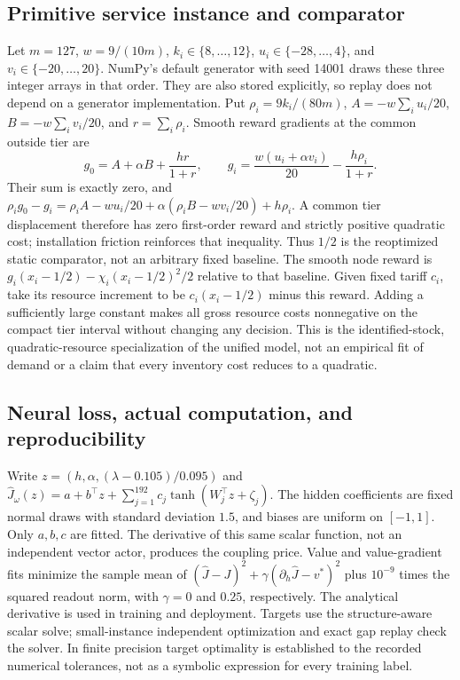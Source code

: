 \documentclass[11pt,letterpaper]{article}
\theoremstyle{definition}
\newcommand{\1}{\mathbf 1}
\begin{document}
\subsection{Primitive service instance and comparator}
Let $m=127$, $w=9/(10m)$, $k_i\in\{8,\ldots,12\}$, $u_i\in\{-28,\ldots,4\}$, and $v_i\in\{-20,\ldots,20\}$. NumPy's default generator with seed 14001 draws these three integer arrays in that order. They are also stored explicitly, so replay does not depend on a generator implementation. Put $\rho_i=9k_i/(80m)$, $A=-w\sum_i u_i/20$, $B=-w\sum_i v_i/20$, and $r=\sum_i\rho_i$. Smooth reward gradients at the common outside tier are
\[
 g_0=A+\alpha B+\frac{hr}{1+r},\qquad
 g_i=\frac{w(u_i+\alpha v_i)}{20}-\frac{h\rho_i}{1+r}.
\]
Their sum is exactly zero, and $\rho_i g_0-g_i=\rho_i A-wu_i/20+\alpha(\rho_i B-wv_i/20)+h\rho_i$. A common tier displacement therefore has zero first-order reward and strictly positive quadratic cost; installation friction reinforces that inequality. Thus $1/2$ is the reoptimized static comparator, not an arbitrary fixed baseline. The smooth node reward is $g_i(x_i-1/2)-\chi_i(x_i-1/2)^2/2$ relative to that baseline. Given fixed tariff $c_i$, take its resource increment to be $c_i(x_i-1/2)$ minus this reward. Adding a sufficiently large constant makes all gross resource costs nonnegative on the compact tier interval without changing any decision. This is the identified-stock, quadratic-resource specialization of the unified model, not an empirical fit of demand or a claim that every inventory cost reduces to a quadratic.

\subsection{Neural loss, actual computation, and reproducibility}
Write $z=(h,\alpha,(\lambda-0.105)/0.095)$ and
$\widehat J_\omega(z)=a+b^\top z+\sum_{j=1}^{192}c_j\tanh(W_j^\top z+\zeta_j)$.
The hidden coefficients are fixed normal draws with standard deviation $1.5$, and biases are uniform on $[-1,1]$. Only $a,b,c$ are fitted. The derivative of this same scalar function, not an independent vector actor, produces the coupling price. Value and value-gradient fits minimize the sample mean of $(\widehat J-J)^2+\gamma(\partial_h\widehat J-v^*)^2$ plus $10^{-9}$ times the squared readout norm, with $\gamma=0$ and $0.25$, respectively. The analytical derivative is used in training and deployment. Targets use the structure-aware scalar solve; small-instance independent optimization and exact gap replay check the solver. In finite precision target optimality is established to the recorded numerical tolerances, not as a symbolic expression for every training label.
\end{document}
